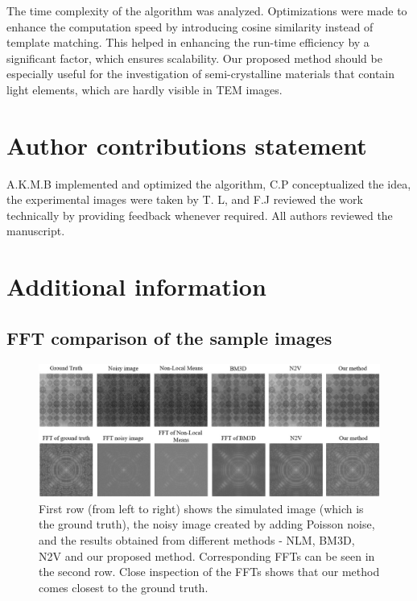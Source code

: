 \documentclass[fleqn,10pt]{wlscirep}
\begin{document}
	The time complexity of the algorithm was analyzed. Optimizations were made to enhance the computation speed by introducing cosine similarity instead of template matching. This helped in enhancing the run-time efficiency by a significant factor, which ensures scalability. Our proposed method should be especially useful for the investigation of semi-crystalline materials that contain light elements, which are hardly visible in TEM images.  
	
	

	
	
	\section*{Author contributions statement}
	
	A.K.M.B implemented and optimized the algorithm, C.P conceptualized the idea, the experimental images were taken by T. L, and F.J reviewed the work technically by providing feedback whenever required.  All authors reviewed the manuscript. 
	
	\section*{Additional information}
	
	\subsection*{FFT comparison of the sample images}
	\label{fftcomparison}
	
	\begin{figure}[H]
		\centering
		\includegraphics[scale=0.6]{./imgs/comparison-sample_fft.jpg}
		\caption{First row (from left to right) shows the simulated image (which is the ground truth), the noisy image created by adding Poisson noise, and the results obtained from different methods - NLM, BM3D, N2V and our proposed method. Corresponding FFTs can be seen in the second row. Close inspection of the FFTs shows that our method comes closest to the ground truth.}
		\label{fig:comparison_sample_fft}
	\end{figure}
\end{document}
